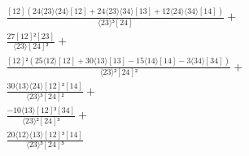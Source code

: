 \documentclass[varwidth, border=5pt]{standalone}
\begin{document}
\begin{my}
$\begin{gathered}
\scriptscriptstyle\frac{[12](24⟨23⟩⟨24⟩[12]+24⟨23⟩⟨34⟩[13]+12⟨24⟩⟨34⟩[14])}{⟨23⟩³[24]} +\\
\scriptscriptstyle\frac{27[12]²[23]}{⟨23⟩[24]²} +\\
\scriptscriptstyle\frac{[12]²(25⟨12⟩[12]+30⟨13⟩[13]-15⟨14⟩[14]-3⟨34⟩[34])}{⟨23⟩²[24]²} +\\
\scriptscriptstyle\frac{30⟨13⟩⟨24⟩[12]²[14]}{⟨23⟩³[24]²} +\\
\scriptscriptstyle\frac{-10⟨13⟩[12]³[34]}{⟨23⟩²[24]³} +\\
\scriptscriptstyle\frac{20⟨12⟩⟨13⟩[12]³[14]}{⟨23⟩³[24]³} \phantom{+}
\end{gathered}$
\end{my}
\end{document}
